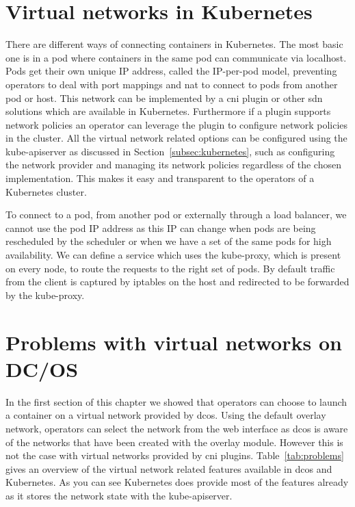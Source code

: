 \section{Virtual networks in Kubernetes}
\label{sec:k8s-virtual-networks}
There are different ways of connecting containers in Kubernetes. The most basic one is in a pod where containers in the same pod can communicate via localhost. Pods get their own unique IP address, called the IP-per-pod model, preventing operators to deal with port mappings and \gls{nat} to connect to pods from another pod or host. This network can be implemented by a \gls{cni} plugin or other \gls{sdn} solutions\cite{k8s-network} which are available in Kubernetes. Furthermore if a plugin supports network policies an operator can leverage the plugin to configure network policies in the cluster. All the virtual network related options can be configured using the kube-apiserver as discussed in Section~\ref{subsec:kubernetes}, such as configuring the network provider and managing its network policies regardless of the chosen implementation. This makes it easy and transparent to the operators of a Kubernetes cluster.

To connect to a pod, from another pod or externally through a load balancer, we cannot use the pod IP address as this IP can change when pods are being rescheduled by the scheduler or when we have a set of the same pods for high availability. We can define a service which uses the kube-proxy, which is present on every node, to route the requests to the right set of pods. By default traffic from the client is captured by iptables\cite{iptables} on the host and redirected to be forwarded by the kube-proxy.

\section{Problems with virtual networks on DC/OS}
\label{sec:problems}
In the first section of this chapter we showed that operators can choose to launch a container on a virtual network provided by \gls{dcos}. Using the default overlay network, operators can select the network from the web interface as \gls{dcos} is aware of the networks that have been created with the overlay module. However this is not the case with virtual networks provided by \gls{cni} plugins. Table~\ref{tab:problems} gives an overview of the virtual network related features available in \gls{dcos} and Kubernetes. As you can see Kubernetes does provide most of the features already as it stores the network state with the kube-apiserver.


